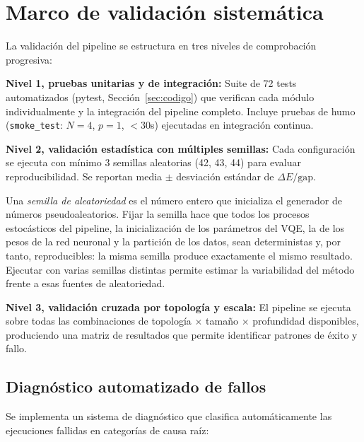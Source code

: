 \documentclass[11pt,a4paper,spanish]{book}
\begin{document}
\section{Marco de validación sistemática}

La validación del pipeline se estructura en tres niveles de comprobación progresiva:

\textbf{Nivel 1, pruebas unitarias y de integración:} Suite de 72 tests automatizados (pytest, Sección~\ref{sec:codigo}) que verifican cada módulo individualmente y la integración del pipeline completo. Incluye pruebas de humo (\texttt{smoke\_test}: $N=4$, $p=1$, $<30$s) ejecutadas en integración continua.

\textbf{Nivel 2, validación estadística con múltiples semillas:} Cada configuración se ejecuta con mínimo 3 semillas aleatorias (42, 43, 44) para evaluar reproducibilidad. Se reportan media $\pm$ desviación estándar de $\Delta E/\text{gap}$.

\noindent Una \emph{semilla de aleatoriedad} es el número entero que inicializa el generador de números pseudoaleatorios. Fijar la semilla hace que todos los procesos estocásticos del pipeline, la inicialización de los parámetros del VQE, la de los pesos de la red neuronal y la partición de los datos, sean deterministas y, por tanto, reproducibles: la misma semilla produce exactamente el mismo resultado. Ejecutar con varias semillas distintas permite estimar la variabilidad del método frente a esas fuentes de aleatoriedad.

\textbf{Nivel 3, validación cruzada por topología y escala:} El pipeline se ejecuta sobre todas las combinaciones de topología $\times$ tamaño $\times$ profundidad disponibles, produciendo una matriz de resultados que permite identificar patrones de éxito y fallo.

\subsection{Diagnóstico automatizado de fallos}

Se implementa un sistema de diagnóstico que clasifica automáticamente las ejecuciones fallidas en categorías de causa raíz:
\end{document}
